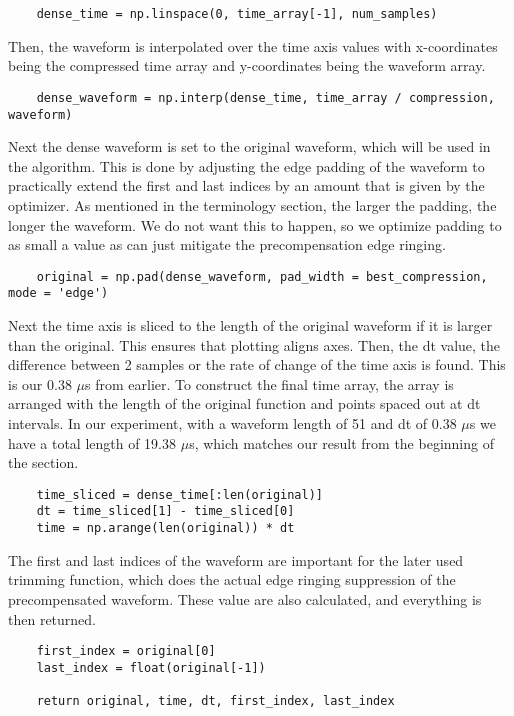 \documentclass[11pt, a4paper]{article}
\theoremstyle{definition}
\numberwithin{equation}{section}
\begin{document}
\begin{verbatim}
    dense_time = np.linspace(0, time_array[-1], num_samples)
\end{verbatim}

Then, the waveform is interpolated over the time axis values with x-coordinates being the compressed time array and y-coordinates being the waveform array.

\begin{verbatim}
    dense_waveform = np.interp(dense_time, time_array / compression, waveform)
\end{verbatim}

Next the dense waveform is set to the original waveform, which will be used in the algorithm. This is done by adjusting the edge padding of the waveform to practically extend the first and last indices by an amount that is given by the optimizer. As mentioned in the terminology section, the larger the padding, the longer the waveform. We do not want this to happen, so we optimize padding to as small a value as can just mitigate the precompensation edge ringing.

\begin{verbatim}
    original = np.pad(dense_waveform, pad_width = best_compression, mode = 'edge')
\end{verbatim}

Next the time axis is sliced to the length of the original waveform if it is larger than the original. This ensures that plotting aligns axes. Then, the dt value, the difference between 2 samples or the rate of change of the time axis is found. This is our 0.38 $\mu$s from earlier. To construct the final time array, the array is arranged with the length of the original function and points spaced out at dt intervals. In our experiment, with a waveform length of 51 and dt of 0.38 $\mu$s we have a total length of 19.38 $\mu$s, which matches our result from the beginning of the section.

\begin{verbatim}
    time_sliced = dense_time[:len(original)]
    dt = time_sliced[1] - time_sliced[0]
    time = np.arange(len(original)) * dt
\end{verbatim}

The first and last indices of the waveform are important for the later used trimming function, which does the actual edge ringing suppression of the precompensated waveform. These value are also calculated, and everything is then returned.

\begin{verbatim}
    first_index = original[0]
    last_index = float(original[-1])

    return original, time, dt, first_index, last_index
\end{verbatim}
\end{document}
